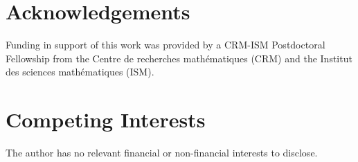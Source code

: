 \documentclass[11pt,reqno]{amsart}
\newcommand{\green}{\textcolor[rgb]{0.00,0.50,0.50}}
\newcommand{\Ind}{\mathbb{I}}
\begin{document}
%


%


\section*{Acknowledgements}

Funding in support of this work was provided by a CRM-ISM Postdoctoral Fellowship from the Centre de recherches mathématiques (CRM) and the Institut des sciences mathématiques (ISM).
 \section*{Competing Interests}
The author has no relevant financial or non-financial interests to disclose.
%
%

%
%
\end{document}
